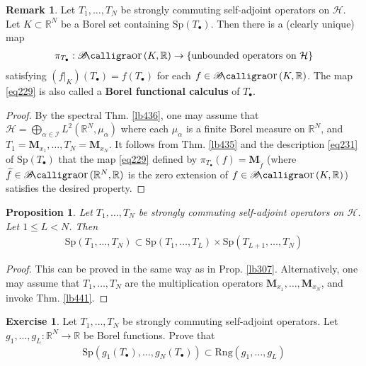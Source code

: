\documentclass[12pt,b5paper,notitlepage]{article}
\theoremstyle{definition}
\newtheorem{exe}[df]{Exercise}
\newtheorem{rem}[df]{Remark}
\theoremstyle{plain}
\newtheorem{pp}[df]{Proposition}
\DeclareMathOperator{\Bor}{\mathscr{B}\text{\kern -2pt {\calligra\large or}}\,}
\newcommand{\wtd}{\widetilde}
\newcommand{\blt}{\bullet}
\newcommand{\Rbb}{\mathbb R}
\newcommand{\Sp}{\mathrm{Sp}}
\newcommand{\Rng}{\mathrm{Rng}}
\newcommand{\MH}{\mathcal H}
\newcommand{\SI}{\mathscr I}
\newcommand{\Mbf}{\mathbf M}
\numberwithin{equation}{section}
\begin{document}
\begin{rem}
Let $T_1,\dots,T_N$ be strongly commuting self-adjoint operators on $\MH$. Let $K\subset\Rbb^N$ be a Borel set containing $\Sp(T_\blt)$. Then there is a (clearly unique) map
\begin{align}\label{eq229}
\pi_{T_\blt}:\Bor(K,\Rbb)\rightarrow\{\text{unbounded operators on }\MH\}
\end{align}
satisfying $(f|_K)(T_\blt)=f(T_\blt)$ for each $f\in\Bor(K,\Rbb)$. The map \eqref{eq229} is also called a \textbf{Borel functional calculus}  of $T_\blt$.
\end{rem}

\begin{proof}
By the spectral Thm. \ref{lb436}, one may assume that $\MH=\bigoplus_{\alpha\in\SI}L^2(\Rbb^N,\mu_\alpha)$ where each $\mu_\alpha$ is a finite Borel measure on $\Rbb^N$, and $T_1=\Mbf_{x_1},\dots,T_N=\Mbf_{x_N}$. It follows from Thm. \ref{lb435} and the description \eqref{eq231} of $\Sp(T_\blt)$ that the map \eqref{eq229} defined by $\pi_{T_\blt}(f)=\Mbf_{\wtd f}$ (where $\wtd f\in\Bor(\Rbb^N,\Rbb)$ is the zero extension of $f\in\Bor(K,\Rbb)$) satisfies the desired property.
\end{proof}



\begin{pp}
Let $T_1,\dots,T_N$ be strongly commuting self-adjoint operators on $\MH$. Let $1\leq L<N$. Then
\begin{align}
\Sp(T_1,\dots,T_N)\subset\Sp(T_1,\dots,T_L)\times\Sp(T_{L+1},\dots,T_N)
\end{align}
\end{pp}

\begin{proof}
This can be proved in the same way as in Prop. \ref{lb307}. Alternatively, one may assume that $T_1,\dots,T_N$ are the multiplication operators $\Mbf_{x_1},\dots,\Mbf_{x_N}$, and invoke Thm. \ref{lb441}.
\end{proof}

\begin{exe}\label{lb474}
Let $T_1,\dots,T_N$ be strongly commuting self-adjoint operators. Let $g_1,\dots,g_L:\Rbb^N\rightarrow\Rbb$ be Borel functions. Prove that
\begin{align*}
\Sp(g_1(T_\blt),\dots,g_N(T_\blt))\subset\Rng(g_1,\dots,g_L)
\end{align*}
\end{exe}
\end{document}
